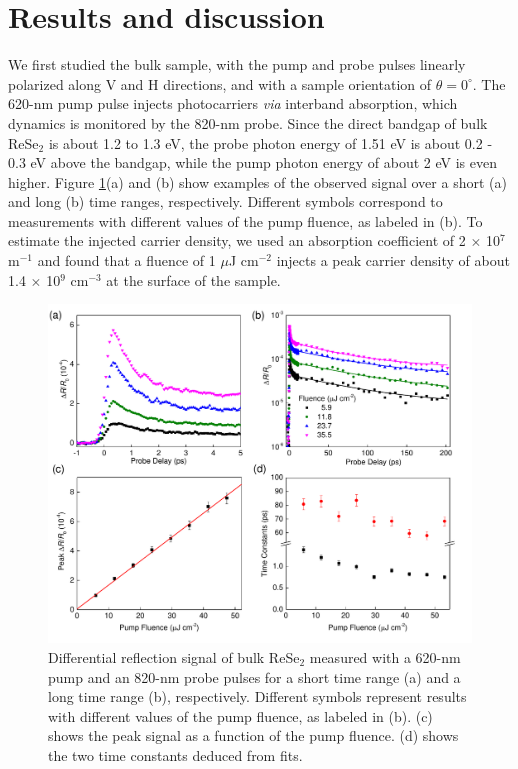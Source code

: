\documentclass{osa-article}
\begin{document}
\section{Results and discussion}

We first studied the bulk sample, with the pump and probe pulses linearly polarized along V and H directions, and with a sample orientation of $\theta = 0^\circ$. The 620-nm pump pulse injects photocarriers {\it via} interband absorption, which dynamics is monitored by the 820-nm probe. Since the direct bandgap of bulk ReSe$_2$ is about 1.2 to 1.3 eV\cite{jap816380}, the probe photon energy of 1.51 eV is about 0.2 - 0.3 eV above the bandgap, while the pump photon energy of about 2 eV is even higher. Figure \ref{fig:bulk}(a) and (b) show examples of the observed signal over a short (a) and long (b) time ranges, respectively. Different symbols correspond to measurements with different values of the pump fluence, as labeled in (b). To estimate the injected carrier density, we used an absorption coefficient \cite{jssc51170} of 2 $\times$ 10$^7$ m$^{-1}$ and found that a fluence of 1 $\mu$J cm$^{-2}$ injects a peak carrier density of about 1.4 $\times$ 10$^9$ cm$^{-3}$ at the surface of the sample.

\begin{figure}
  \centering
  \includegraphics[width=12cm]{bulk.pdf}
  \caption{Differential reflection signal of bulk ReSe$_2$ measured with a 620-nm pump and an 820-nm probe pulses for a short time range (a) and a long time range (b), respectively. Different symbols represent results with different values of the pump fluence, as labeled in (b). (c) shows the peak signal as a function of the pump fluence. (d) shows the two time constants deduced from fits.}
    \label{fig:bulk}
\end{figure}
\end{document}
